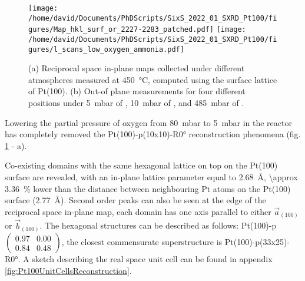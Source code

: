 \begin{figure}[!htb]
    \centering
    \texttt{[image: /home/david/Documents/PhDScripts/SixS\_2022\_01\_SXRD\_Pt100/figures/Map\_hkl\_surf\_or\_2227-2283\_patched.pdf]}
    \texttt{[image: /home/david/Documents/PhDScripts/SixS\_2022\_01\_SXRD\_Pt100/figures/l\_scans\_low\_oxygen\_ammonia.pdf]}
    \caption{
        (a) Reciprocal space in-plane maps collected under different atmospheres measured at \qty{450}{\degreeCelsius}, computed using the surface lattice of Pt(100).
        (b) Out-of plane measurements for four different positions under \qty{5}{\milli\bar} of , \qty{10}{\milli\bar} of , and \qty{485}{\milli\bar} of .
    }
    \label{fig:MapsAndLScansPt100LowOxAmmonia}
\end{figure}

Lowering the partial pressure of oxygen from \qty{80}{\milli\bar} to \qty{5}{\milli\bar} in the reactor has completely removed the Pt(100)-p(10x10)-R\ang{0} reconstruction phenomena (fig. \ref{fig:MapsAndLScansPt100LowOxAmmonia} - a).

Co-existing domains with the same hexagonal lattice on top on the Pt(100) surface are revealed, with an in-plane lattice parameter equal to \qty{2.68}{\angstrom}, \qty{\approx 3.36}{\percent} lower than the distance between neighbouring Pt atoms on the Pt(100) surface (\qty{2.77}{\angstrom}).
Second order peaks can also be seen at the edge of the reciprocal space in-plane map, each domain has one axis parallel to either $\vec{a}_{(100)}$ or $\vec{b}_{(100)}$.
The hexagonal structures can be described as follows: Pt(100)-p$\begin{pmatrix} 0.97 & 0.00\\ 0.84 & 0.48 \end{pmatrix}$, the closest commensurate superstructure is Pt(100)-p(33x25)-R\ang{0}.
A sketch describing the real space unit cell can be found in appendix \ref{fig:Pt100UnitCellsReconstruction}.

